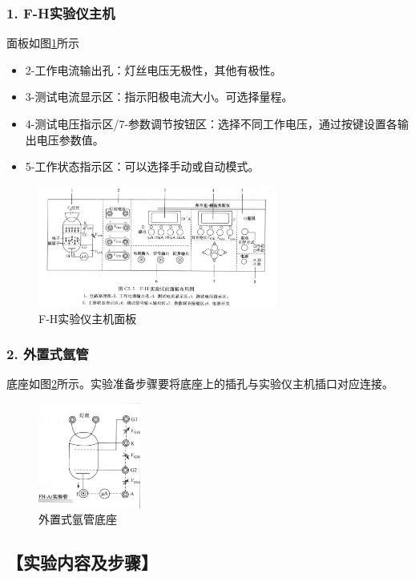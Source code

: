 \documentclass[12pt,a4paper,UTF8]{ctexart}
\begin{document}
	\subsubsection*{1. F-H实验仪主机}
		面板如图\ref{fig:illus-2}所示
		\begin{itemize}
			\item 2-工作电流输出孔：灯丝电压无极性，其他有极性。
			\item 3-测试电流显示区：指示阳极电流大小。可选择量程。
			\item 4-测试电压指示区/7-参数调节按钮区：选择不同工作电压，通过按键设置各输出电压参数值。
			\item 5-工作状态指示区：可以选择手动或自动模式。
		\end{itemize}
		\begin{figure}[htbp]
			\centering
			\includegraphics[width=0.7\textwidth]{attachments/C2_illus-2.jpg}
			\caption{F-H实验仪主机面板}
			\label{fig:illus-2}
		\end{figure}
	\subsubsection*{2. 外置式氩管}
		底座如图\ref{fig:illus-3}所示。实验准备步骤要将底座上的插孔与实验仪主机插口对应连接。
		\begin{figure}[htbp]
			\centering
			\includegraphics[width=0.3\textwidth]{attachments/C2_illus-3.jpg}
			\caption{外置式氩管底座}
			\label{fig:illus-3}
		\end{figure}
		
		
\subsection*{【实验内容及步骤】}
\end{document}
